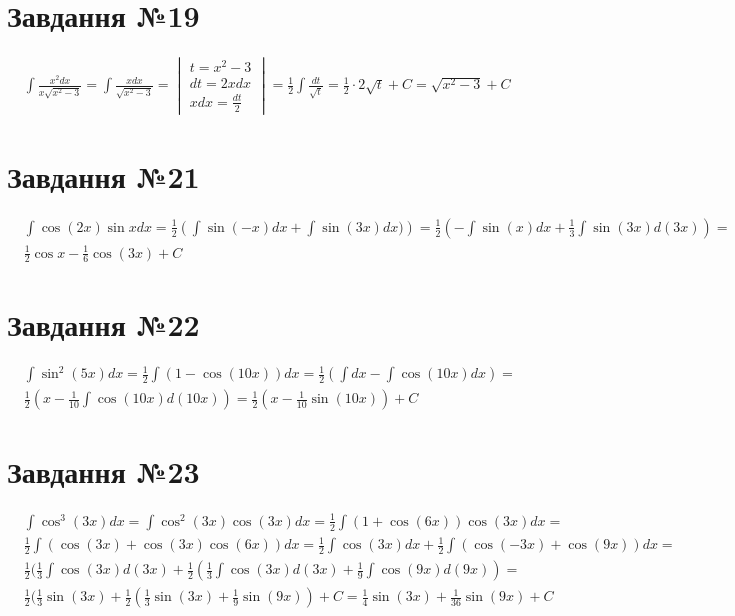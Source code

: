 \documentclass{report}
\begin{document}
\section{Завдання №19}
\begin{equation}\begin{split}
	& \int \frac{x^2 dx}{x\sqrt{x^2 - 3}} = \int \frac{xdx}{\sqrt{x^2 - 3}} = \begin{vmatrix}t = x^2 - 3\\dt = 2xdx\\xdx = \frac{dt}{2}\end{vmatrix} = \frac{1}{2}\int\frac{dt}{\sqrt{t}} = \frac{1}{2}\cdot2\sqrt{t} + C = \sqrt{x^2 - 3} + C
\end{split}\end{equation}

\section{Завдання №21}
\begin{equation}\begin{split}
	& \int \cos(2x)\sin x dx=\frac{1}{2} \left(\int \sin(-x)dx + \int\sin(3x)dx)\right) = \frac{1}{2}\left(-\int\sin(x)dx + \frac{1}{3}\int\sin(3x)d(3x)\right) =\\
	& \frac{1}{2}\cos x - \frac{1}{6} \cos(3x) + C
\end{split}\end{equation}

\section{Завдання №22}
\begin{equation}\begin{split}
	& \int \sin^2(5x)dx = \frac{1}{2}\int(1 - \cos (10x))dx = \frac{1}{2}(\int dx - \int\cos(10x)dx) =\\
	& \frac{1}{2}(x - \frac{1}{10}\int\cos(10x)d(10x)) = \frac{1}{2}(x - \frac{1}{10}\sin(10x)) + C
\end{split}\end{equation}

\section{Завдання №23}
\begin{equation}\begin{split}
	& \int \cos^3(3x)dx = \int \cos^2(3x)\cos(3x)dx = \frac{1}{2}\int(1+\cos(6x))\cos(3x)dx =\\
	& \frac{1}{2}\int(\cos(3x) + \cos(3x)\cos(6x))dx = \frac{1}{2}\int\cos(3x)dx + \frac{1}{2}\int(\cos(-3x) + \cos(9x))dx =\\
	& \frac{1}{2}(\frac{1}{3}\int\cos(3x)d(3x) + \frac{1}{2}(\frac{1}{3}\int\cos(3x)d(3x) + \frac{1}{9}\int\cos(9x)d(9x)) =\\
	& \frac{1}{2}(\frac{1}{3}\sin(3x) + \frac{1}{2}(\frac{1}{3}\sin(3x) + \frac{1}{9}\sin(9x)) + C = \frac{1}{4}\sin(3x) + \frac{1}{36}\sin(9x) + C
\end{split}\end{equation}
\end{document}
